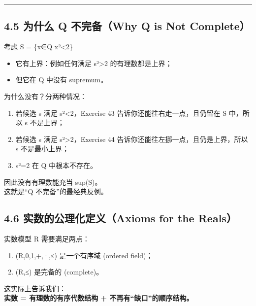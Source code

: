 \documentclass[
  11pt,
]{article}
\providecommand{\tightlist}{%
  \setlength{\itemsep}{0pt}\setlength{\parskip}{0pt}}
\begin{document}
\begin{center}\rule{0.5\linewidth}{0.5pt}\end{center}

\subsection{4.5 为什么 Q 不完备（Why Q is Not
Complete）}\label{ux4e3aux4ec0ux4e48-q-ux4e0dux5b8cux5907why-q-is-not-complete}

考虑 S = \{x∈Q \textbar{} x²\textless2\}

\begin{itemize}
\tightlist
\item
  它有上界：例如任何满足 s²\textgreater2 的有理数都是上界；
\item
  但它在 Q 中没有 supremum。
\end{itemize}

为什么没有？分两种情况：

\begin{enumerate}
\def\labelenumi{\arabic{enumi}.}
\tightlist
\item
  若候选 s 满足 s²\textless2，Exercise 43 告诉你还能往右走一点，且仍留在
  S 中，所以 s 不是上界；
\item
  若候选 s 满足 s²\textgreater2，Exercise 44
  告诉你还能往左挪一点，且仍是上界，所以 s 不是最小上界；
\item
  s²=2 在 Q 中根本不存在。
\end{enumerate}

因此没有有理数能充当 sup(S)。\\
这就是``Q 不完备''的最经典反例。

\subsection{4.6 实数的公理化定义（Axioms for the
Reals）}\label{ux5b9eux6570ux7684ux516cux7406ux5316ux5b9aux4e49axioms-for-the-reals}

实数模型 R 需要满足两点：

\begin{enumerate}
\def\labelenumi{\arabic{enumi}.}
\tightlist
\item
  (R,0,1,+,·,≤) 是一个有序域 (ordered field)；
\item
  (R,≤) 是完备的 (complete)。
\end{enumerate}

这实际上告诉我们：\\
\textbf{实数 = 有理数的有序代数结构 + 不再有``缺口''的顺序结构。}
\end{document}
